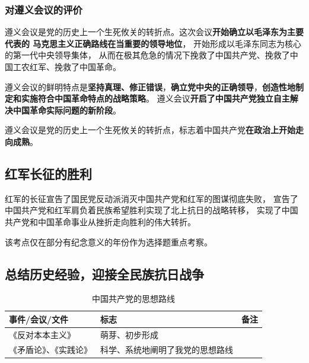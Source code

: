 \documentclass[10pt, UTF8]{book} %
\begin{document}
\subsubsection{对遵义会议的评价}

遵义会议是党的历史上一个生死攸关的转折点。这次会议\textbf{开始确立以毛泽东为主要代表的
马克思主义正确路线在当重要的领导地位}，
开始形成以毛泽东同志为核心的第一代中央领导集体，
从而在极其危急的情况下挽救了中国共产党、挽救了中国工农红军、挽救了中国革命。

遵义会议的鲜明特点是\textbf{坚持真理、修正错误}，\textbf{确立党中央的正确领导}，\textbf{创造性地制定和实施符合中国革命特点的战略策略}。
遵义会议\textbf{开启了中国共产党独立自主解决中国革命实际问题的新阶段}。

遵义会议是党的历史上一个生死攸关的转折点，标志着中国共产党\textbf{在政治上开始走向成熟}。

\subsection{红军长征的胜利}

红军的长征宣告了国民党反动派消灭中国共产党和红军的图谋彻底失败，
宣告了中国共产党和红军肩负着民族希望胜利实现了北上抗日的战略转移，
实现了中国共产党和中国革命事业从挫折走向胜利的伟大转折。
\begin{remark}
    该考点仅在部分有纪念意义的年份作为选择题重点考察。
\end{remark}



\subsection{总结历史经验，迎接全民族抗日战争}

\begin{table}[H]
    \centering
    \caption{中国共产党的思想路线}
    \begin{tabular}{p{}|p{}p{}}
        \hline 
        \textbf{事件/会议/文件} & \textbf{标志} & \textbf{备注} \\ 
        \hline 
        《反对本本主义》 & 萌芽、初步形成 & \\ 
        \hline 
        《矛盾论》、《实践论》 & 科学、系统地阐明了我党的思想路线 \\ 
        \hline
    \end{tabular}
\end{table}
\end{document}
